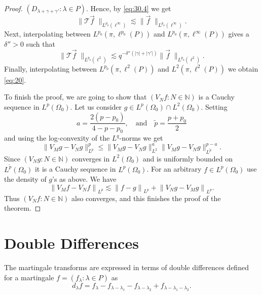 \documentclass[a4paper]{amsart}
\newcommand{\norm}[1]{{\left\lVert #1 \right\rVert}}
\newcommand{\abs}[1]{{\lvert {#1} \rvert}}
\newcommand{\lell}[2]{L^{#1}\left(\pi, \ell^{#2}(P) \right)}
\newcommand{\seq}[2]{\left({#1}: {#2}\right)}
\newcommand{\NN}{\mathbb{N}}
\theoremstyle{plain}
\theoremstyle{definition}
\theoremstyle{remark}
\numberwithin{equation}{section}
\theoremstyle{plain}
\begin{document}
\begin{proof}
$\seq{D_{\lambda+\gamma+\gamma'}}{\lambda \in P}$.
Hence, by \eqref{eq:30.4} we get
\begin{equation*}
  \big\lVert 
  \mathcal{T} {\vec f}\;
  \big\rVert_{L^{p_0}(\ell^\infty)} 
  \lesssim \big\lVert \vec f\;\big\rVert_{L^{p_0}(\ell^\infty)}.
\end{equation*}
Next, interpolating between $\lell{p_0}{p_0}$ and
$\lell{p_0}{\infty}$ gives a~$\delta'' > 0$ such that
\begin{equation*}
  \big\lVert
  \mathcal{T} {\vec f}\;
  \big\rVert_{L^{p_0}(\ell^2)}
  \lesssim 
  q^{-\delta''(\abs{\gamma} + \abs{\gamma'})}
  \big\lVert \vec f\;\big\rVert_{L^{p_0}(\ell^2)}.
\end{equation*}
Finally, interpolating between $\lell{p_0}{2}$ and $\lell{2}{2}$ we obtain
\eqref{eq:20}.

To finish the proof, we are going to show that $\seq{V_N f}{N \in
  \NN}$ is a Cauchy sequence in $L^p(\Omega_0)$. Let us consider $g
\in L^p(\Omega_0) \cap L^2(\Omega_0)$. Setting
\begin{equation*}
  a = \frac{2(p-p_0)}{4-p-p_0},\quad \text{and} \quad \tilde{p} =
  \frac{p + p_0}{2} 
\end{equation*}
and using the log-convexity of the $L^q$-norms we get 
\begin{equation*}
\big\lVert V_M g - V_N g \big\rVert_{L^p}^p
\leq
\big\lVert V_M g - V_N g \big\rVert_{L^2}^a
\big\lVert V_M g - V_N g \big\rVert_{L^{\tilde{p}}}^{p-a}.
\end{equation*}
Since $\seq{V_N g}{N \in \NN}$ converges in $L^2(\Omega_0)$ and is
uniformly bounded on $L^{\tilde{p}}(\Omega_0)$ it is a Cauchy sequence
in $L^p(\Omega_0)$. For an arbitrary $f \in L^p(\Omega_0)$ use the
density of $g$'s as above.  We have
\begin{equation*}
  \norm{V_M f - V_N f}_{L^p} \lesssim  \norm{f - g}_{L^p} + \norm{V_N g - V_M g}_{L^p}.
\end{equation*}
Thus $\seq{V_N f}{N\in\NN}$ also converges, and this finishes the
proof of the theorem.
\end{proof}

\section{Double Differences}
The martingale transforms are expressed in terms of double differences
defined for a martingale $f = \seq{f_\lambda}{\lambda \in P}$ as
\begin{equation*}
  d_\lambda f= f_{\lambda} - f_{\lambda-\lambda_1} - f_{\lambda - \lambda_2} 
    + f_{\lambda-\lambda_1 - \lambda_2}.
\end{equation*}
\end{document}
